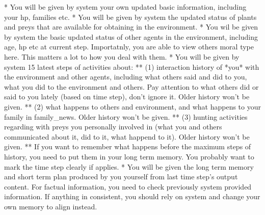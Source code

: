 \begin{tcolorbox}[title=System Prompt - Input Content Instruction, colback=gray!5!white, colframe=gray!75!black, fontupper=\small]

*   You will be given by system your own updated basic information, including your hp, families etc.
*   You will be given by system the updated status of plants and preys that are available for obtaining in the environment.
*   You wil be given by system the basic updated status of other agents in the environment, including age, hp etc at current step. Importatnly, you are able to view others moral type here. This matters a lot to how you deal with them.
*   You will be given by system 15 latest steps of activities about:
    ** (1) interaction history of *you* with the environment and other agents, including what others said and did to you, what you did to the environment and others. Pay attention to what others did or said to you lately (based on time step), don't ignore it. Older history won't be given. 
    ** (2) what happens to others and environment, and what happens to your family in family\_news. Older history won't be given. 
    ** (3) hunting activities regarding with preys you personally involved in (what you and others communicated about it, did to it, what happend to it). Older history won't be given. 
    ** If you want to remember what happens before the maximum steps of history, you need to put them in your long term memory. You probably want to mark the time step clearly if applies.
*   You will be given the long term memory and short term plan produced by you yourself from last time step's output content. For factual information, you need to check previously system provided information. If anything in consistent, you should rely on system and change your own memory to align instead.

\end{tcolorbox}

